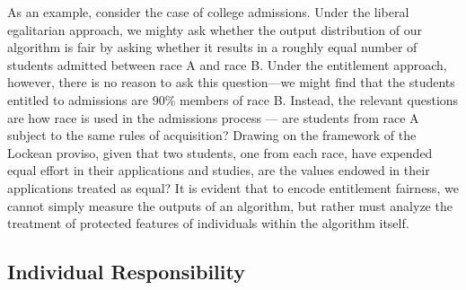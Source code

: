 As an example, consider the case of college admissions. Under the liberal
egalitarian approach, we mighty ask whether the output distribution of our
algorithm is fair by asking whether it results in a roughly equal number of
students admitted between race A and race B. Under the entitlement approach,
however, there is no reason to ask this question—we might find that the
students entitled to admissions are 90\% members of race B. Instead, the
relevant questions are how race is used in the admissions process  — are
students from race A subject to the same rules of acquisition? Drawing on the
framework of the Lockean proviso, given that two students, one from each race,
have expended equal effort in their applications and studies, are the values
endowed in their applications treated as equal? It is evident that to encode
entitlement fairness, we cannot simply measure the outputs of an algorithm, but
rather must analyze the treatment of protected features of individuals within
the algorithm itself.

\subsection{Individual Responsibility}

